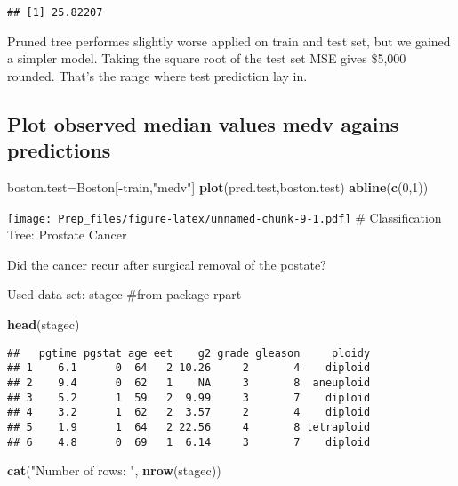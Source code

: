 \documentclass[]{article}
\newenvironment{Shaded}{\begin{snugshade}}{\end{snugshade}}
\newcommand{\DecValTok}[1]{\textcolor[rgb]{0.00,0.00,0.81}{#1}}
\newcommand{\KeywordTok}[1]{\textcolor[rgb]{0.13,0.29,0.53}{\textbf{#1}}}
\newcommand{\NormalTok}[1]{#1}
\newcommand{\OperatorTok}[1]{\textcolor[rgb]{0.81,0.36,0.00}{\textbf{#1}}}
\newcommand{\StringTok}[1]{\textcolor[rgb]{0.31,0.60,0.02}{#1}}
\begin{document}
\begin{verbatim}
## [1] 25.82207
\end{verbatim}

Pruned tree performes slightly worse applied on train and test set, but
we gained a simpler model. Taking the square root of the test set MSE
gives \$5,000 rounded. That's the range where test prediction lay in.

\hypertarget{plot-observed-median-values-medv-agains-predictions}{%
\subsection{Plot observed median values medv agains
predictions}\label{plot-observed-median-values-medv-agains-predictions}}

\begin{Shaded}
\begin{Highlighting}[]
\NormalTok{boston.test=Boston[}\OperatorTok{-}\NormalTok{train,}\StringTok{"medv"}\NormalTok{]}
\KeywordTok{plot}\NormalTok{(pred.test,boston.test)}
\KeywordTok{abline}\NormalTok{(}\KeywordTok{c}\NormalTok{(}\DecValTok{0}\NormalTok{,}\DecValTok{1}\NormalTok{))}
\end{Highlighting}
\end{Shaded}

\texttt{[image: Prep\_files/figure-latex/unnamed-chunk-9-1.pdf]} \#
Classification Tree: Prostate Cancer

Did the cancer recur after surgical removal of the postate?

Used data set: stagec \#from package rpart

\begin{Shaded}
\begin{Highlighting}[]
\KeywordTok{head}\NormalTok{(stagec)}
\end{Highlighting}
\end{Shaded}

\begin{verbatim}
##   pgtime pgstat age eet    g2 grade gleason     ploidy
## 1    6.1      0  64   2 10.26     2       4    diploid
## 2    9.4      0  62   1    NA     3       8  aneuploid
## 3    5.2      1  59   2  9.99     3       7    diploid
## 4    3.2      1  62   2  3.57     2       4    diploid
## 5    1.9      1  64   2 22.56     4       8 tetraploid
## 6    4.8      0  69   1  6.14     3       7    diploid
\end{verbatim}

\begin{Shaded}
\begin{Highlighting}[]
\KeywordTok{cat}\NormalTok{(}\StringTok{"Number of rows: "}\NormalTok{, }\KeywordTok{nrow}\NormalTok{(stagec))}
\end{Highlighting}
\end{Shaded}
\end{document}
